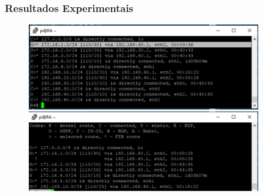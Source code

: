 
\begin{frame}
	\frametitle{Resultados Experimentais}

	\begin{figure}[h]
		\centering
		\includegraphics[width=0.9\textwidth]{"../Relatorio/Artigo IoT-G4/figs/resultado3"}
		\label{resultado3}
 	\end{figure}
\end{frame}


